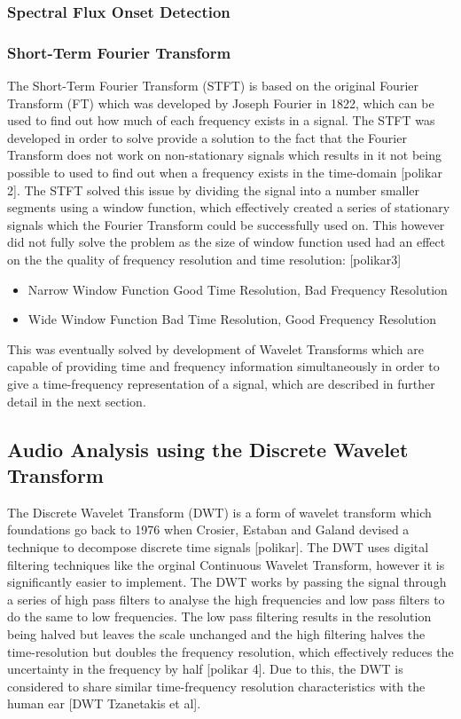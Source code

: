 \documentclass[a4paper, 11pt]{article}
\begin{document}
\subsubsection{Spectral Flux Onset Detection}


\subsubsection{Short-Term Fourier Transform}
The Short-Term Fourier Transform (STFT) is based on the original Fourier Transform (FT) which was developed by Joseph Fourier in 1822, which can be used to find out how much of each frequency exists in a signal. The STFT was developed in order to solve provide a solution to the fact that the Fourier Transform does not work on non-stationary signals which results in it not being possible to used to find out when a frequency exists in the time-domain [polikar 2]. The STFT solved this issue by dividing the signal into a number smaller segments using a window function, which effectively created a series of stationary signals which the Fourier Transform could be successfully used on. This however did not fully solve the problem as the size of window function used had an effect on the the quality of frequency resolution and time resolution:
[polikar3]
\begin{itemize}
\item Narrow Window Function \longrightarrow  Good Time Resolution, Bad Frequency Resolution
\item Wide Window Function \longrightarrow  Bad Time Resolution, Good Frequency Resolution
\end{itemize}

This was eventually solved by development of Wavelet Transforms which are capable of providing time and frequency information simultaneously in order to give a time-frequency representation of a signal, which are described in further detail in the next section.

\subsection{Audio Analysis using the Discrete Wavelet Transform}
The Discrete Wavelet Transform (DWT) is a form of wavelet transform which foundations go back to 1976 when Crosier, Estaban and Galand devised a technique to decompose discrete time signals [polikar]. The DWT uses digital filtering techniques like the orginal Continuous Wavelet Transform, however it is significantly easier to implement. The DWT works by passing the signal through a series of high pass filters to analyse the high frequencies and low pass filters to do the same to low frequencies. The low pass filtering results in the resolution being halved but leaves the scale unchanged and the high filtering halves the time-resolution but doubles the frequency resolution, which effectively reduces the uncertainty in the frequency by half [polikar 4]. Due to this, the DWT is considered to share similar time-frequency resolution characteristics with the human ear [DWT Tzanetakis et al].
\end{document}
